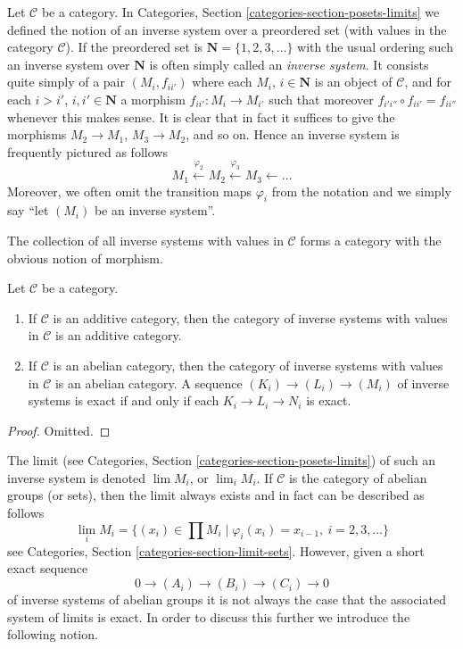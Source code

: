 \noindent
Let $\mathcal{C}$ be a category.
In Categories, Section \ref{categories-section-posets-limits}
we defined the notion of an inverse system over a preordered set
(with values in the category $\mathcal{C}$).
If the preordered set is $\mathbf{N} = \{1, 2, 3, \ldots\}$
with the usual ordering such an inverse system over $\mathbf{N}$
is often simply called an {\it inverse system}. It consists quite simply
of a pair $(M_i, f_{ii'})$ where each $M_i$, $i \in \mathbf{N}$
is an object of $\mathcal{C}$, and for each $i > i'$, $i, i' \in \mathbf{N}$
a morphism $f_{ii'} : M_i \to M_{i'}$ such that moreover
$f_{i'i''} \circ f_{ii'} = f_{ii''}$ whenever this makes sense.
It is clear that in fact it suffices to give the morphisms
$M_2 \to M_1$, $M_3 \to M_2$, and so on. Hence an inverse system
is frequently pictured as follows
$$
M_1 \xleftarrow{\varphi_2} M_2 \xleftarrow{\varphi_3} M_3 \leftarrow \ldots
$$
Moreover, we often omit the transition maps $\varphi_i$ from the notation
and we simply say ``let $(M_i)$ be an inverse system''.

\medskip\noindent
The collection of all inverse systems with values in
$\mathcal{C}$ forms a category with the obvious notion of morphism.

\begin{lemma}
\label{lemma-inverse-systems-abelian}
Let $\mathcal{C}$ be a category.
\begin{enumerate}
\item If $\mathcal{C}$ is an additive category, then the category
of inverse systems with values in $\mathcal{C}$ is an additive category.
\item If $\mathcal{C}$ is an abelian category, then the category
of inverse systems with values in $\mathcal{C}$ is an abelian category.
A sequence $(K_i) \to (L_i) \to (M_i)$ of inverse systems
is exact if and only if each $K_i \to L_i \to N_i$ is exact.
\end{enumerate}
\end{lemma}

\begin{proof}
Omitted.
\end{proof}

\noindent
The limit (see Categories, Section \ref{categories-section-posets-limits})
of such an inverse system is denoted $\lim M_i$, or $\lim_i M_i$.
If $\mathcal{C}$ is the category of abelian groups (or sets), then the limit
always exists and in fact can be described as follows
$$
\lim_i M_i
=
\{(x_i) \in \prod M_i \mid \varphi_i(x_i) = x_{i - 1}, \ i = 2, 3, \ldots\}
$$
see Categories, Section \ref{categories-section-limit-sets}.
However, given a short exact sequence
$$
0 \to (A_i) \to (B_i) \to (C_i) \to 0
$$
of inverse systems of abelian groups it is not always the case
that the associated system of limits is exact. In order to discuss
this further we introduce the following notion.

